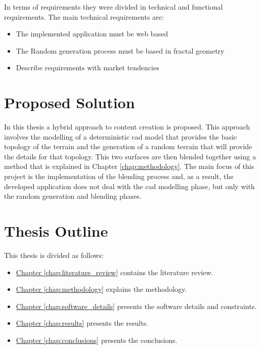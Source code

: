 In terms of requirements they were divided in technical and functional requirements. The main technical requirements are:
\begin{itemize}
	\item The implemented application must be web based
	\item The Random generation process must be based in fractal geometry
\end{itemize}

\begin{itemize}
	\item Describe requirements with market tendencies
\end{itemize}

\section{Proposed Solution}

In this thesis a hybrid approach to content creation is proposed. This approach involves the modelling of a deterministic cad model that provides the basic topology of the terrain and the generation of a random terrain that will provide the details for that topology. This two surfaces are then blended together using a method that is explained in Chapter \ref{chap:methodology}. The main focus of this project is the implementation of the blending process and, as a result, the developed application does not deal with the cad modelling phase, but only with the random generation and blending phases.


\section{Thesis Outline}

This thesis is divided as follows:
\begin{itemize}
	\item \underline{Chapter \ref{chap:literature_review}} contains the literature review.
	\item \underline{Chapter \ref{chap:methodology}} explains the methodology.
	\item \underline{Chapter \ref{chap:software_details}} presents the software details and constraints.
	\item \underline{Chapter \ref{chap:results}} presents the results.
	\item \underline{Chapter \ref{chap:conclusions}} presents the conclusions.
\end{itemize}
